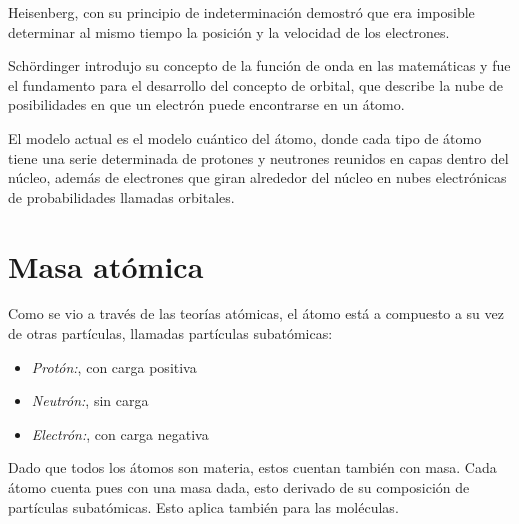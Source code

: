 Heisenberg, con su principio de indeterminación demostró que era imposible determinar al mismo tiempo la posición y la velocidad de los electrones.

Schördinger introdujo su concepto de la función de onda en las matemáticas y fue el fundamento para el desarrollo del concepto de orbital, que describe la nube de posibilidades en que un electrón puede encontrarse en un átomo.

El modelo actual es el modelo cuántico del átomo, donde cada tipo de átomo tiene una serie determinada de protones y neutrones reunidos en capas dentro del núcleo, además de electrones que giran alrededor del núcleo en  nubes electrónicas de probabilidades llamadas orbitales.



\section{Masa atómica}

Como se vio a través de las teorías atómicas, el átomo está a compuesto a su vez de otras partículas, llamadas partículas subatómicas:

\begin{itemize}
    \item \emph{Protón:}, con carga positiva
    \item \emph{Neutrón:}, sin carga
    \item \emph{Electrón:}, con carga negativa
\end{itemize}

Dado que todos los átomos son materia, estos cuentan también con masa. Cada átomo cuenta pues con una masa dada, esto derivado de su composición de partículas subatómicas. Esto aplica también para las moléculas.
